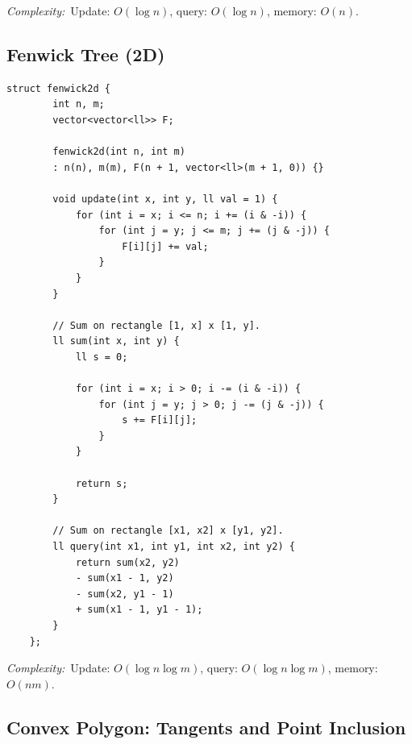 \documentclass[10pt,a4paper]{article}
\newcommand{\complexity}[1]{\textit{Complexity:}~#1}
\begin{document}
\complexity{Update: $O(\log n)$, query: $O(\log n)$, memory: $O(n)$.}

\subsection*{Fenwick Tree (2D)}

\begin{lstlisting}[style=cpp]
	struct fenwick2d {
		int n, m;
		vector<vector<ll>> F;
		
		fenwick2d(int n, int m)
		: n(n), m(m), F(n + 1, vector<ll>(m + 1, 0)) {}
		
		void update(int x, int y, ll val = 1) {
			for (int i = x; i <= n; i += (i & -i)) {
				for (int j = y; j <= m; j += (j & -j)) {
					F[i][j] += val;
				}
			}
		}
		
		// Sum on rectangle [1, x] x [1, y].
		ll sum(int x, int y) {
			ll s = 0;
			
			for (int i = x; i > 0; i -= (i & -i)) {
				for (int j = y; j > 0; j -= (j & -j)) {
					s += F[i][j];
				}
			}
			
			return s;
		}
		
		// Sum on rectangle [x1, x2] x [y1, y2].
		ll query(int x1, int y1, int x2, int y2) {
			return sum(x2, y2)
			- sum(x1 - 1, y2)
			- sum(x2, y1 - 1)
			+ sum(x1 - 1, y1 - 1);
		}
	};
\end{lstlisting}

\complexity{Update: $O(\log n\log m)$, query: $O(\log n\log m)$, memory: $O(nm)$.}

\subsection*{Convex Polygon: Tangents and Point Inclusion}
\end{document}
